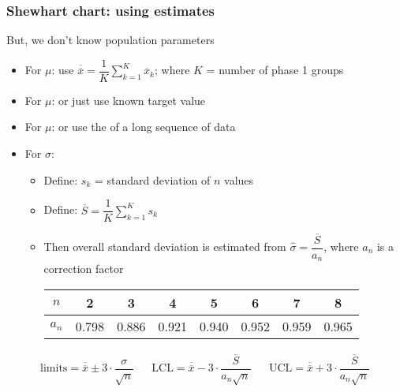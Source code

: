 \begin{frame}\frametitle{Shewhart chart: using estimates}

	But, we don't know population parameters
	\begin{itemize}
		\item	For $\mu$: use $\overline{\overline{x}} = \dfrac{1}{K} \displaystyle \sum_{k=1}^{K}{ \overline{x}_k}$; {\small where $K$ = number of phase 1 groups}
		\item	For $\mu$: or just use known target value
		\item	For $\mu$: or use the {} of a long sequence of data
		\item	For $\sigma$:
		\begin{itemize}
			\item	Define: $s_k$ = standard deviation of $n$ values
			\item	Define: $\overline{S} = \dfrac{1}{K} \displaystyle \sum_{k=1}^{K}{s_k}$
			\item	Then overall standard deviation is estimated from $\hat{\sigma} = \dfrac{\overline{S}}{a_n}$, where $a_n$ is a correction factor
			
				\vspace{6pt}
				\begin{tabular}{|c|ccccccc|}\hline
					$n$		&	2		&	3		&	4		&	5		&	6		&	7		&	8		\\ \hline
					$a_n$	&	0.798	&	0.886	&	0.921	&	0.940	&	0.952	&	0.959	&	0.965	\\ \hline
				\end{tabular}
		\end{itemize}
	\end{itemize}
	
	$$
	\begin{array}{rcccl}
		\text{limits} = \overline{\overline{x}} \pm 3 \cdot \dfrac{\sigma}{\sqrt{n}}  && \text{LCL} = \overline{\overline{x}} - 3 \cdot \dfrac{\overline{S}}{a_n\sqrt{n}} &&  \text{UCL} = \overline{\overline{x}} + 3 \cdot \dfrac{\overline{S}}{a_n\sqrt{n}}
	\end{array}
	$$
\end{frame}

